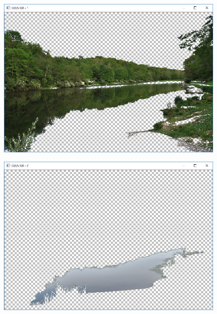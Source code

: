 \documentclass[czech, master, public, dept460, male, cpdeclaration, oneside]{diploma}
\begin{document}
\begin{figure}[H]
	\vspace*{+3.0mm}
	\centering
	\includegraphics[width=13cm]{Figures/results/euclidean/img2/cluster1.png}
\end{figure}
\begin{figure}[H]
	\vspace*{+3.0mm}
	\centering
	\includegraphics[width=13cm]{Figures/results/euclidean/img2/cluster2.png}
\end{figure}
\end{document}
